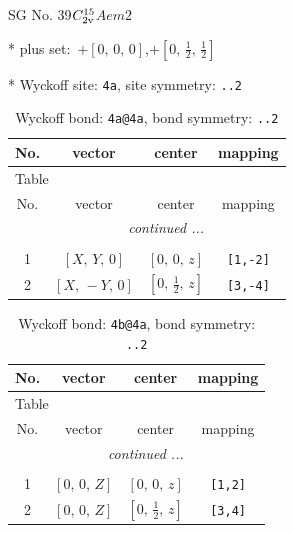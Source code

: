 \documentclass[fleqn,8pt]{jsarticle}
\begin{document}
\setcounter{MaxMatrixCols}{32}

\renewcommand{\tablename}{Table~}
\renewcommand{\figurename}{Figure~}
\begin{center}
\LARGE
SG No. 39\quad$C_{\rm 2v}^{15}$\quad$Aem2$\quad[ orthorhombic ]
\end{center}

* plus set:\,\,\,$+\left[ 0,\, 0,\, 0 \right]$,\quad $+\left[ 0,\, \frac{1}{2},\, \frac{1}{2} \right]$


* Wyckoff site: {\tt 4a}, site symmetry: {\tt ..2}
\renewcommand{\arraystretch}{1.2}
\begin{longtable}{cccc}
\caption{Wyckoff bond: {\tt 4a@4a}, bond symmetry: {\tt ..2}}
 \\
 \hline \hline
No. & vector & center & mapping \\ \hline \endfirsthead

\multicolumn{3}{l}{\tablename\ \thetable{}} \\
 \hline \hline
No. & vector & center & mapping \\ \hline \endhead

 \hline \hline
\multicolumn{3}{r}{\footnotesize\it continued ...} \\ \endfoot

 \hline \hline
\multicolumn{3}{r}{} \\ \endlastfoot

1 & $\left[ X,\, Y,\, 0 \right]$ & $\left[ 0,\, 0,\, z \right]$ & {\tt [1,-2]} \\ \hline
2 & $\left[ X,\, - Y,\, 0 \right]$ & $\left[ 0,\, \frac{1}{2},\, z \right]$ & {\tt [3,-4]} \\
\end{longtable}
\renewcommand{\arraystretch}{1.2}
\begin{longtable}{cccc}
\caption{Wyckoff bond: {\tt 4b@4a}, bond symmetry: {\tt ..2}}
 \\
 \hline \hline
No. & vector & center & mapping \\ \hline \endfirsthead

\multicolumn{3}{l}{\tablename\ \thetable{}} \\
 \hline \hline
No. & vector & center & mapping \\ \hline \endhead

 \hline \hline
\multicolumn{3}{r}{\footnotesize\it continued ...} \\ \endfoot

 \hline \hline
\multicolumn{3}{r}{} \\ \endlastfoot

1 & $\left[ 0,\, 0,\, Z \right]$ & $\left[ 0,\, 0,\, z \right]$ & {\tt [1,2]} \\ \hline
2 & $\left[ 0,\, 0,\, Z \right]$ & $\left[ 0,\, \frac{1}{2},\, z \right]$ & {\tt [3,4]} \\
\end{longtable}
\end{document}
